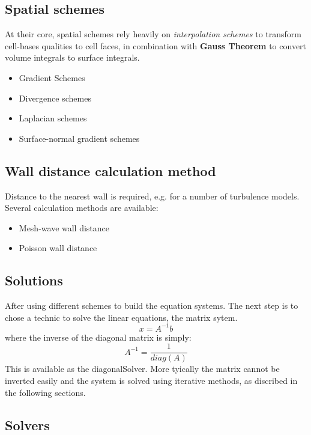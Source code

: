 \documentclass{article}
\begin{document}
\subsection{Spatial schemes}

At their core, spatial schemes rely heavily on \textit{interpolation schemes} to transform cell-bases qualities to cell faces, in combination with \textbf{Gauss Theorem} to convert volume integrals to surface integrals.

\begin{itemize}
\item Gradient Schemes
\item Divergence schemes
\item Laplacian schemes
\item Surface-normal gradient schemes
\end{itemize}

\subsection{Wall distance calculation method}

Distance to the nearest wall is required, e.g. for a number of turbulence models. Several calculation methods are available:
\begin{itemize}
\item Mesh-wave wall distance
\item Poisson wall distance 
\end{itemize}

\subsection{Solutions}

After using different schemes to build the equation systems. The next step is to chose a technic to solve the linear equations, the matrix sytem. 
\begin{equation}
x = A^{-1}b
\end{equation}
where the inverse of the diagonal matrix is simply:
\begin{equation}
A^{-1} = \frac{1}{diag(A)}
\end{equation}
This is available as the diagonalSolver. More tyically the matrix cannot be inverted easily and the system is solved using iterative methods, as discribed in the following sections. 

\subsection{Solvers}
\end{document}
